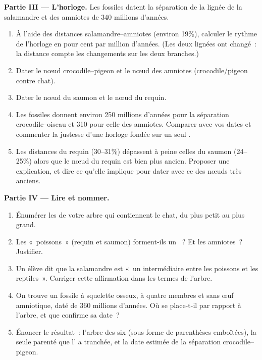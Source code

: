 \begin{problem}
\medskip
\noindent\textbf{Partie III --- L'horloge.}
Les fossiles datent la séparation de la lignée de la salamandre et des
amniotes de 340 millions d'années.
\begin{enumerate}[resume]
  \item À l'aide des distances salamandre--amniotes (environ 19\%),
        calculer le rythme de l'horloge en pour cent par million
        d'années. (Les deux lignées ont changé~: la distance compte
        les changements sur les deux branches.)
  \item Dater le nœud crocodile--pigeon et le nœud des amniotes
        (crocodile/pigeon contre chat).
  \item Dater le nœud du saumon et le nœud du requin.
  \item Les fossiles donnent environ 250 millions d'années pour la
        séparation crocodile--oiseau et 310 pour celle des amniotes.
        Comparer avec vos dates et commenter la justesse d'une horloge
        fondée sur un seul .
  \item Les distances du requin (30--31\%) dépassent à peine celles du
        saumon (24--25\%) alors que le nœud du requin est bien plus
        ancien. Proposer une explication, et dire ce qu'elle implique
        pour dater avec ce  des nœuds très anciens.
\end{enumerate}

\medskip
\noindent\textbf{Partie IV --- Lire et nommer.}
\begin{enumerate}[resume]
  \item Énumérer les  de votre arbre qui contiennent le chat, du
        plus petit au plus grand.
  \item Les «~poissons~» (requin et saumon) forment-ils un ~? Et
        les amniotes~? Justifier.
  \item Un élève dit que la salamandre est «~un intermédiaire entre
        les poissons et les reptiles~». Corriger cette affirmation
        dans les termes de l'arbre.
  \item On trouve un fossile à squelette osseux, à quatre membres et
        sans œuf amniotique, daté de 360 millions d'années. Où se
        place-t-il par rapport à l'arbre, et que confirme sa date~?
  \item Énoncer le résultat~: l'arbre des six  (sous forme de
        parenthèses emboîtées), la seule parenté que l' a tranchée,
        et la date estimée de la séparation crocodile--pigeon.
\end{enumerate}
\end{problem}
